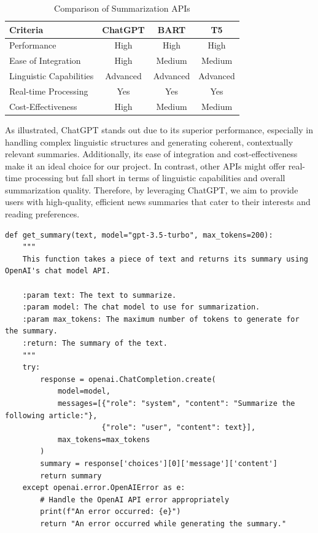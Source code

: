 \documentclass[10pt]{article}
\begin{document}
\begin{table}[H]
    \centering
    \begin{tabular}{lccc}
    \hline
    \textbf{Criteria} & \textbf{ChatGPT} & \textbf{BART} & \textbf{T5} \\ \hline
    Performance & High & High & High \\
    Ease of Integration & High & Medium & Medium \\
    Linguistic Capabilities & Advanced & Advanced & Advanced \\
    Real-time Processing & Yes & Yes & Yes \\
    Cost-Effectiveness & High & Medium & Medium \\ \hline
    \end{tabular}
    \caption{Comparison of Summarization APIs}
\end{table}
    
As illustrated, ChatGPT stands out due to its superior performance, especially in handling complex linguistic structures and generating coherent, contextually relevant summaries. Additionally, its ease of integration and cost-effectiveness make it an ideal choice for our project. In contrast, other APIs might offer real-time processing but fall short in terms of linguistic capabilities and overall summarization quality. Therefore, by leveraging ChatGPT, we aim to provide users with high-quality, efficient news summaries that cater to their interests and reading preferences.

\begin{lstlisting}
def get_summary(text, model="gpt-3.5-turbo", max_tokens=200):
    """
    This function takes a piece of text and returns its summary using OpenAI's chat model API.
    
    :param text: The text to summarize.
    :param model: The chat model to use for summarization.
    :param max_tokens: The maximum number of tokens to generate for the summary.
    :return: The summary of the text.
    """
    try:
        response = openai.ChatCompletion.create(
            model=model,
            messages=[{"role": "system", "content": "Summarize the following article:"},
                      {"role": "user", "content": text}],
            max_tokens=max_tokens
        )
        summary = response['choices'][0]['message']['content']
        return summary
    except openai.error.OpenAIError as e:
        # Handle the OpenAI API error appropriately
        print(f"An error occurred: {e}")
        return "An error occurred while generating the summary."
\end{lstlisting}
\end{document}
